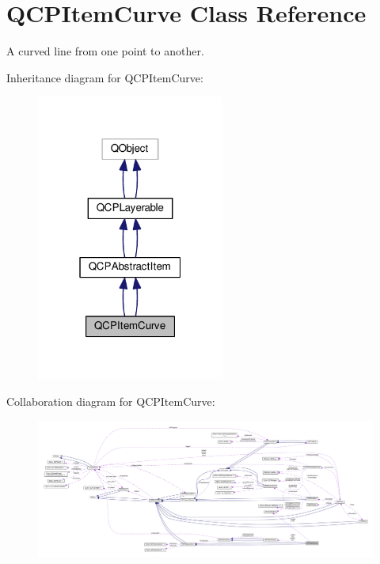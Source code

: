 \hypertarget{class_q_c_p_item_curve}{}\section{Q\+C\+P\+Item\+Curve Class Reference}
\label{class_q_c_p_item_curve}


A curved line from one point to another.  




Inheritance diagram for Q\+C\+P\+Item\+Curve\+:\nopagebreak
\begin{figure}[H]
\begin{center}
\leavevmode
\includegraphics[width=175pt]{class_q_c_p_item_curve__inherit__graph}
\end{center}
\end{figure}


Collaboration diagram for Q\+C\+P\+Item\+Curve\+:\nopagebreak
\begin{figure}[H]
\begin{center}
\leavevmode
\includegraphics[width=350pt]{class_q_c_p_item_curve__coll__graph}
\end{center}
\end{figure}
